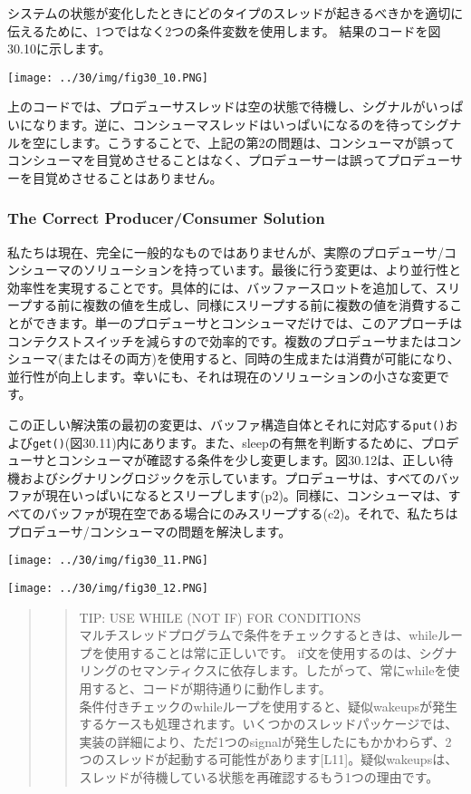 システムの状態が変化したときにどのタイプのスレッドが起きるべきかを適切に伝えるために、1つではなく2つの条件変数を使用します。
結果のコードを図30.10に示します。

\texttt{[image: ../30/img/fig30\_10.PNG]}

上のコードでは、プロデューサスレッドは空の状態で待機し、シグナルがいっぱいになります。逆に、コンシューマスレッドはいっぱいになるのを待ってシグナルを空にします。こうすることで、上記の第2の問題は、コンシューマが誤ってコンシューマを目覚めさせることはなく、プロデューサーは誤ってプロデューサーを目覚めさせることはありません。

\hypertarget{the-correct-producerconsumer-solution}{%
\subsubsection*{The Correct Producer/Consumer
Solution}\label{the-correct-producerconsumer-solution}}

私たちは現在、完全に一般的なものではありませんが、実際のプロデューサ/コンシューマのソリューションを持っています。最後に行う変更は、より並行性と効率性を実現することです。具体的には、バッファースロットを追加して、スリープする前に複数の値を生成し、同様にスリープする前に複数の値を消費することができます。単一のプロデューサとコンシューマだけでは、このアプローチはコンテクストスイッチを減らすので効率的です。複数のプロデューサまたはコンシューマ(またはその両方)を使用すると、同時の生成または消費が可能になり、並行性が向上します。幸いにも、それは現在のソリューションの小さな変更です。

この正しい解決策の最初の変更は、バッファ構造自体とそれに対応する\texttt{put()}および\texttt{get()}(図30.11)内にあります。また、sleepの有無を判断するために、プロデューサとコンシューマが確認する条件を少し変更します。図30.12は、正しい待機およびシグナリングロジックを示しています。プロデューサは、すべてのバッファが現在いっぱいになるとスリープします(p2)。同様に、コンシューマは、すべてのバッファが現在空である場合にのみスリープする(c2)。それで、私たちはプロデューサ/コンシューマの問題を解決します。

\texttt{[image: ../30/img/fig30\_11.PNG]}

\texttt{[image: ../30/img/fig30\_12.PNG]}

\begin{quote}
\begin{quote}
TIP: USE WHILE (NOT IF) FOR CONDITIONS\\
マルチスレッドプログラムで条件をチェックするときは、whileループを使用することは常に正しいです。
if文を使用するのは、シグナリングのセマンティクスに依存します。したがって、常にwhileを使用すると、コードが期待通りに動作します。\\
条件付きチェックのwhileループを使用すると、疑似wakeupsが発生するケースも処理されます。いくつかのスレッドパッケージでは、実装の詳細により、ただ1つのsignalが発生したにもかかわらず、2つのスレッドが起動する可能性があります{[}L11{]}。疑似wakeupsは、スレッドが待機している状態を再確認するもう1つの理由です。
\end{quote}
\end{quote}

